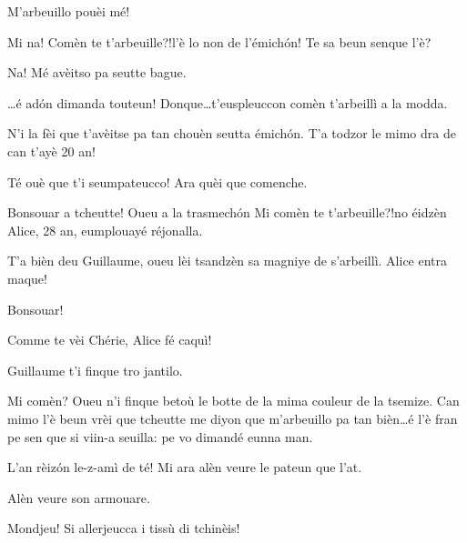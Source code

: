 \begin{drama}
\Vioujspeaks M'arbeuillo pouèi mé!

\Vioupspeaks Mi na! \og Comèn te t’arbeuille?!\fg l’è lo non de l'émich\'on! Te sa beun senque l'è?

\Vioujspeaks Na! Mé avèitso pa seutte bague.

\Vioupspeaks \ldots é ad\'on dimanda touteun! Donque\ldots t'euspleuccon comèn t'arbeillì a la modda.

\Vioujspeaks N'i la fèi que t'avèitse pa tan chouèn seutta émich\'on. T'a to\-dzor le mimo dra de can t'ayè 20 an!

\Vioupspeaks{} Té ouè que t'i seumpateucco! Ara quèi que comenche.





\Guillaumespeaks Bonsouar a tcheutte! Oueu a la trasmech\'on \og Mi comèn te t'arbeuille?!\fg no éidzèn Alice, 28 an, eumplouayé réjonalla.

\Cheriespeaks T'a bièn deu Guillaume, oueu lèi tsandzèn sa magniye de s’arbeillì. Alice entra maque!


\Alicespeaks Bonsouar!


\Guillaumespeaks Comme te vèi Chérie, Alice fé caquì!

\Cheriespeaks Guillaume t’i finque tro jantilo. 

\Alicespeaks Mi comèn? Oueu n'i finque betoù le botte de la mima couleur de la tsemize. Can mimo l'è beun vrèi que tcheutte me diyon que m'arbeuillo pa tan bièn\ldots é l'è fran pe sen que si viin-a seuilla: pe vo dimandé eunna man.

\Cheriespeaks L'an rèiz\'on le-z-amì de té! Mi ara alèn veure le pateun que l'at.

\Guillaumespeaks Alèn veure son armouare.


\Cheriespeaks Mondjeu! Si allerjeucca i tissù di tchinèis!


\end{drama}
